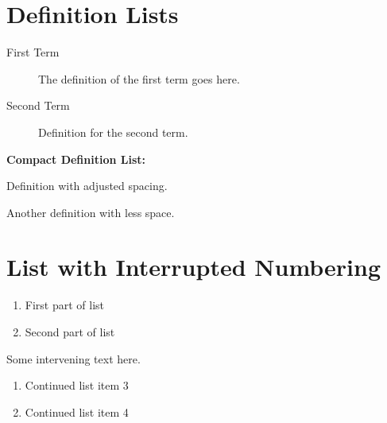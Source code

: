 \documentclass[12pt, a4paper]{article}
\begin{document}
\section*{Definition Lists}

\begin{description}
    \item[First Term] The definition of the first term goes here.
    \item[Second Term] Definition for the second term.
\end{description}

\textbf{Compact Definition List:}
\begin{description}[noitemsep, topsep=0pt, labelwidth=3cm]
    \item[Compact Term 1] Definition with adjusted spacing.
    \item[Compact Term 2] Another definition with less space.
\end{description}

\section*{List with Interrupted Numbering}

\begin{enumerate}
    \item First part of list
    \item Second part of list
\end{enumerate}

\noindent Some intervening text here.

\begin{enumerate}[resume] %
    \item Continued list item 3
    \item Continued list item 4
\end{enumerate}
\end{document}
